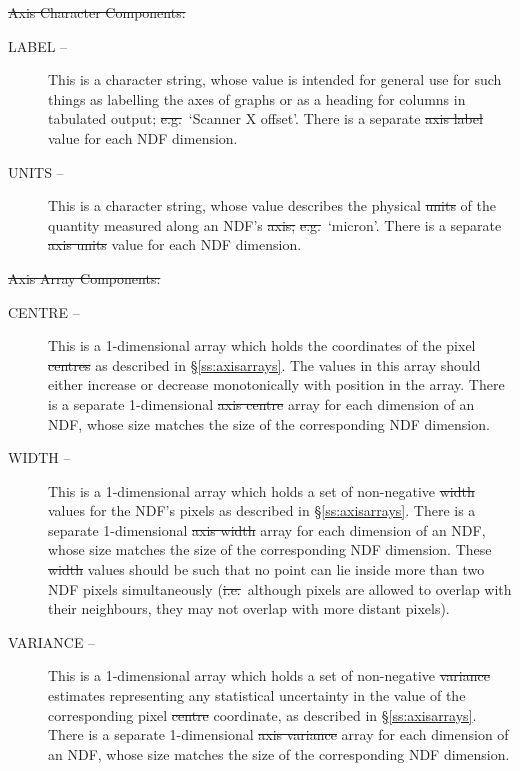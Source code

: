 {\large \st{Axis Character Components:}}\nopagebreak
\begin{description}

\item[LABEL --] This is a character string, whose value is intended for 
general use for such things as labelling the axes of graphs or as a heading 
for columns in tabulated output; \st{e.g.}\ `Scanner X offset'.
There is a separate \st{axis label\/} value for each NDF dimension.

\item[UNITS --] This is a character string, whose value describes the 
physical \st{units\/} of the quantity measured along an NDF's \st{axis;\/}
\st{e.g.}\ `micron'. 
There is a separate \st{axis units\/} value for each NDF dimension.

\end{description}

{\large \st{Axis Array Components:}}\nopagebreak
\begin{description}

\item[CENTRE --] This is a 1-dimensional array which holds the
coordinates of the pixel \st{centres\/} as described in
\S\ref{ss:axisarrays}. The values in this array should either increase
or decrease monotonically with position in the array. There is a
separate 1-dimensional \st{axis centre\/} array for each dimension of
an NDF, whose size matches the size of the corresponding NDF dimension. 

\item[WIDTH --] This is a 1-dimensional array which holds a set of
non-negative \st{width\/} values for the NDF's pixels as described in
\S\ref{ss:axisarrays}.  There is a separate 1-dimensional \st{axis
width\/} array for each dimension of an NDF, whose size matches the
size of the corresponding NDF dimension. These \st{width} values
should be such that no point can lie inside more than two NDF pixels
simultaneously (\st{i.e.}\ although pixels are allowed to overlap with
their neighbours, they may not overlap with more distant pixels).

\item[VARIANCE --] This is a 1-dimensional array which holds a set of
non-negative \st{variance\/} estimates representing any statistical
uncertainty in the value of the corresponding pixel \st{centre\/}
coordinate, as described in \S\ref{ss:axisarrays}.  There is a
separate 1-dimensional \st{axis variance\/} array for each dimension
of an NDF, whose size matches the size of the corresponding NDF
dimension.

\end{description}


